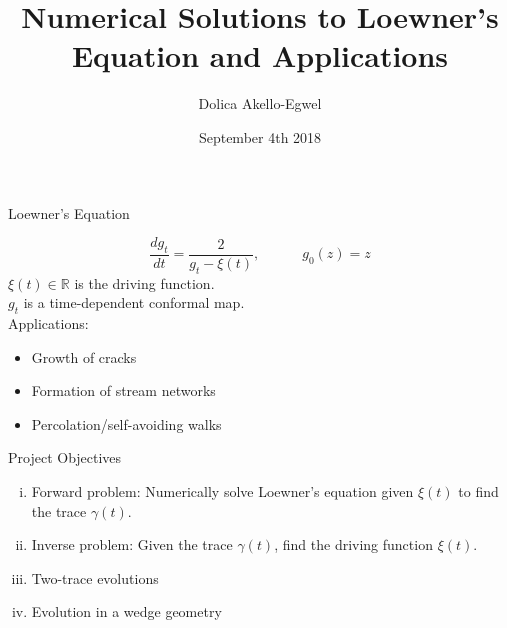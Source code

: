\documentclass{beamer}
\title[]{Numerical Solutions to Loewner's Equation and Applications}
\author{Dolica Akello-Egwel}
\date{September 4th 2018}
\begin{document}
\begin{frame}
\titlepage
\end{frame}

\begin{frame}{Loewner's Equation}
\begin{adjustbox}{max totalsize={.9\textwidth}{.7\textheight},center}

\end{adjustbox}
    $$\frac{dg_t}{dt} = \frac{2}{g_t - \xi(t)}, \quad\quad\quad g_0(z) = z$$
    $\xi(t) \in \mathbb{R}$ is the driving function. \\
    $g_t$ is a time-dependent conformal map. \\
Applications:
\begin{itemize}
\item Growth of cracks
\item Formation of stream networks
\item Percolation/self-avoiding walks
\end{itemize}
\end{frame}

\begin{frame}{Project Objectives}
    \begin{enumerate}[(i)]
        \item Forward problem: Numerically solve Loewner's equation given $\xi(t)$ to find the trace $\gamma(t)$.
        \item Inverse problem: Given the trace $\gamma(t)$, find the driving function $\xi(t)$.
    \item Two-trace evolutions
    \item Evolution in a wedge geometry
\end{enumerate}
\end{frame}
\end{document}
